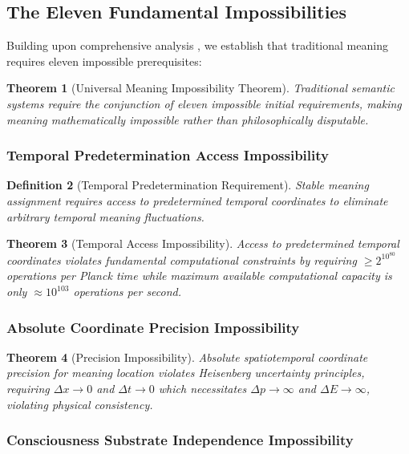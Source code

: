 \documentclass[11pt,a4paper]{article}
\newtheorem{theorem}{Theorem}[section]
\newtheorem{definition}[theorem]{Definition}
\begin{document}
\subsection{The Eleven Fundamental Impossibilities}

Building upon comprehensive analysis \citep{sachikonye2025initial}, we establish that traditional meaning requires eleven impossible prerequisites:

\begin{theorem}[Universal Meaning Impossibility Theorem]
Traditional semantic systems require the conjunction of eleven impossible initial requirements, making meaning mathematically impossible rather than philosophically disputable.
\end{theorem}

\subsubsection{Temporal Predetermination Access Impossibility}

\begin{definition}[Temporal Predetermination Requirement]
Stable meaning assignment requires access to predetermined temporal coordinates to eliminate arbitrary temporal meaning fluctuations.
\end{definition}

\begin{theorem}[Temporal Access Impossibility]
Access to predetermined temporal coordinates violates fundamental computational constraints by requiring $\geq 2^{10^{80}}$ operations per Planck time while maximum available computational capacity is only $\approx 10^{103}$ operations per second.
\end{theorem}

\subsubsection{Absolute Coordinate Precision Impossibility}

\begin{theorem}[Precision Impossibility]
Absolute spatiotemporal coordinate precision for meaning location violates Heisenberg uncertainty principles, requiring $\Delta x \to 0$ and $\Delta t \to 0$ which necessitates $\Delta p \to \infty$ and $\Delta E \to \infty$, violating physical consistency.
\end{theorem}

\subsubsection{Consciousness Substrate Independence Impossibility}
\end{document}
